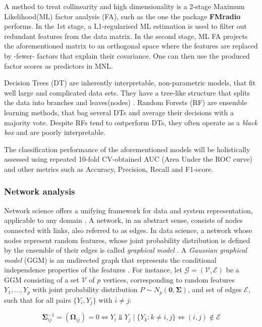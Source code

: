 \documentclass{amsart}
\theoremstyle{plain}
\begin{document}
A method to treat collinearity and high dimensionality is a 2-stage Maximum Likelihood(ML) factor analysis (FA), such as the one the package \textbf{FMradio} \cite{Peeters2019StableData} performs. In the 1st stage, a L1-regularised ML estimation is used to filter out redundant features from the data matrix. In the second stage, ML FA projects the aforementioned matrix to an orthogonal space where the features are replaced by -fewer- factors that explain their covariance. One can then use the produced factor scores as predictors in MNL.

Decision Trees (DT) are inherently interpretable, non-parametric models, that fit well large and complicated data sets. They have a tree-like structure that splits the data into branches and leaves(nodes) \cite{Song2015DecisionPrediction}. Random Forests (RF) are ensemble learning methods, that bag several DTs and average their decisions with a majority vote. Despite RFs tend to outperform DTs, they often operate as a \textit{black box} and are poorly interpretable.

The classification performance of the aforementioned models will be holistically assessed using repeated 10-fold CV-obtained AUC (Area Under the ROC curve) and other metrics such as Accuracy, Precision, Recall and F1-score.

\subsubsection{Network analysis}
Network science offers a unifying framework for data and system representation, applicable to any domain \cite{Barabasi2015NetworkScience}. A network, in an abstract sense, consists of nodes connected with links, also referred to as edges. In data science, a network whose nodes represent random features, whose joint probability distribution is defined by the ensemble of their edges is called \textit{graphical model} \cite{Peeters2022Rags2ridges:Matrices}. A \textit{Gaussian graphical model} (GGM) is an undirected graph that represents the conditional independence properties of the features \cite{KollerProbabilisticTechniques}. For instance, let $\mathcal{G=(V,E)}$ be a GGM consisting of a set $\mathcal{V}$ of $p$ vertices, corresponding to random features $Y_1,...,Y_p$ with joint probability distribution $P \sim N_p(\mathbf{0, \Sigma})$, and set of edges $\mathcal{E}$, such that for all pairs $\{Y_i , Y_j\}$ with $i\neq j$:

\[ \mathbf{\Sigma}_{ij}^{-1} = (\mathbf{\Omega}_{ij})=0 \Longleftrightarrow Y_i \Perp Y_j\mid\{Y_k : k \neq i,j\} \Longleftrightarrow (i, j) \notin \mathcal{E} \]
\end{document}
